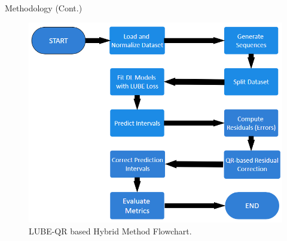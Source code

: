 \documentclass[xcolor=dvipsnames,aspectratio=169]{beamer}
\begin{document}
\begin{frame}{Methodology (Cont.)}
\begin{figure}
    \centering
    \includegraphics[width=0.5\linewidth]{LUBE_QR.png}
    \caption{LUBE-QR based Hybrid Method Flowchart.}
    \label{fig:enter-label}
\end{figure}
\end{frame}
\end{document}
